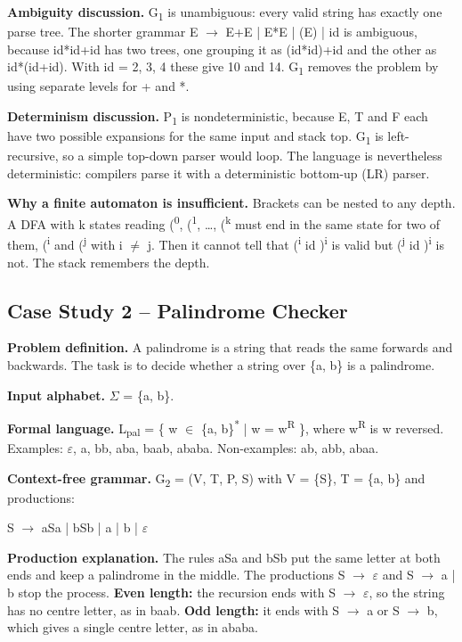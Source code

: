 \documentclass[12pt,a4paper]{article}
\begin{document}
\textbf{Ambiguity discussion.} G\textsubscript{1} is unambiguous: every valid string has exactly one parse tree. The shorter grammar E \ensuremath{\rightarrow} E+E | E*E | (E) | id is ambiguous, because id*id+id has two trees, one grouping it as (id*id)+id and the other as id*(id+id). With id = 2, 3, 4 these give 10 and 14. G\textsubscript{1} removes the problem by using separate levels for + and *.

\textbf{Determinism discussion.} P\textsubscript{1} is nondeterministic, because E, T and F each have two possible expansions for the same input and stack top. G\textsubscript{1} is left-recursive, so a simple top-down parser would loop. The language is nevertheless deterministic: compilers parse it with a deterministic bottom-up (LR) parser.

\textbf{Why a finite automaton is insufficient.} Brackets can be nested to any depth. A DFA with k states reading (\textsuperscript{0}, (\textsuperscript{1}, \ldots{}, (\textsuperscript{k} must end in the same state for two of them, (\textsuperscript{i} and (\textsuperscript{j} with i \ensuremath{\neq} j. Then it cannot tell that (\textsuperscript{i} id )\textsuperscript{i} is valid but (\textsuperscript{j} id )\textsuperscript{i} is not. The stack remembers the depth.

\subsection{Case Study 2 -- Palindrome Checker}

\textbf{Problem definition.} A palindrome is a string that reads the same forwards and backwards. The task is to decide whether a string over \{a, b\} is a palindrome.

\textbf{Input alphabet.} \ensuremath{\Sigma} = \{a, b\}.

\textbf{Formal language.} L\textsubscript{pal} = \{ w \ensuremath{\in} \{a, b\}\textsuperscript{*} | w = w\textsuperscript{R} \}, where w\textsuperscript{R} is w reversed. Examples: \ensuremath{\varepsilon}, a, bb, aba, baab, ababa. Non-examples: ab, abb, abaa.

\textbf{Context-free grammar.} G\textsubscript{2} = (V, T, P, S) with V = \{S\}, T = \{a, b\} and productions:

\begin{center}S \ensuremath{\rightarrow} aSa  |  bSb  |  a  |  b  |  \ensuremath{\varepsilon}\end{center}

\textbf{Production explanation.} The rules aSa and bSb put the same letter at both ends and keep a palindrome in the middle. The productions S \ensuremath{\rightarrow} \ensuremath{\varepsilon} and S \ensuremath{\rightarrow} a | b stop the process. \textbf{Even length:} the recursion ends with S \ensuremath{\rightarrow} \ensuremath{\varepsilon}, so the string has no centre letter, as in baab. \textbf{Odd length:} it ends with S \ensuremath{\rightarrow} a or S \ensuremath{\rightarrow} b, which gives a single centre letter, as in ababa.
\end{document}
